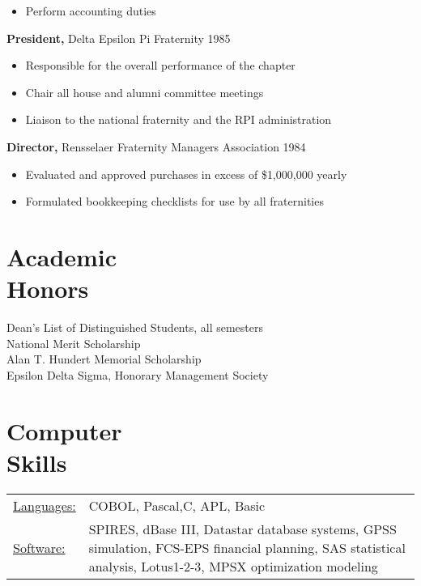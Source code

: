 \documentclass[margin]{res}
\begin{document}
\begin{resume}
\begin{itemize}
                \item  Perform accounting duties

		 \end{itemize}

		{\bf President,} Delta Epsilon Pi Fraternity \hfill   1985
                \begin{itemize} \itemsep -2pt
                 \item  Responsible for the overall performance of the
                 chapter

                 \item Chair all house and alumni committee meetings

                 \item Liaison to the national fraternity and the RPI
                 administration
		 \end{itemize}

                  {\bf  Director,}  Rensselaer Fraternity Managers
              Association     \hfill                                 1984
                 \begin{itemize} \itemsep -2pt

               \item    Evaluated and approved purchases in excess of
                 {\$}1,000,000 yearly

               \item  Formulated bookkeeping checklists for use by all
                 fraternities
		 \end{itemize}

\section{Academic \\ Honors}
Dean's List of Distinguished Students, all semesters \\
National Merit Scholarship \\
Alan T. Hundert Memorial Scholarship \\
 Epsilon Delta Sigma, Honorary Management Society


\section{Computer \\ Skills}
   \begin{tabular}{l p{3in}}
    \underline{Languages:} & COBOL, Pascal,C, APL, Basic \\

     \underline{Software:} &  SPIRES, dBase III, Datastar database
                        systems, GPSS simulation, FCS-EPS financial
                        planning, SAS statistical analysis,
                        Lotus1-2-3, MPSX optimization modeling
 \end{tabular}

\end{resume}
\end{document}
